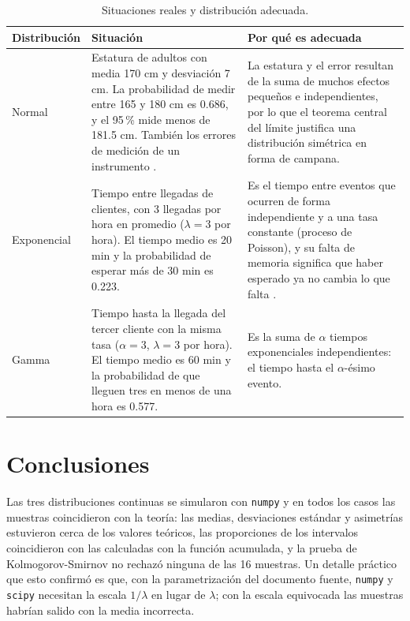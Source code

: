 \documentclass[11pt,letterpaper]{article}
\begin{document}
\begin{table}[htbp]
\centering
\caption{Situaciones reales y distribución adecuada.}
\label{tab:aplicaciones}
\footnotesize
\renewcommand{\arraystretch}{1.3}
\begin{tabular}{p{2.3cm}p{5.2cm}p{5.4cm}}
\hline
\textbf{Distribución} & \textbf{Situación} & \textbf{Por qué es adecuada} \\
\hline
Normal & Estatura de adultos con media 170 cm y desviación 7 cm. La probabilidad de medir entre 165 y 180 cm es 0.686, y el 95\,\% mide menos de 181.5 cm. También los errores de medición de un instrumento \parencite{tecnm2026_documento_fuente}. & La estatura y el error resultan de la suma de muchos efectos pequeños e independientes, por lo que el teorema central del límite justifica una distribución simétrica en forma de campana. \\
Exponencial & Tiempo entre llegadas de clientes, con 3 llegadas por hora en promedio ($\lambda = 3$ por hora). El tiempo medio es 20 min y la probabilidad de esperar más de 30 min es 0.223. & Es el tiempo entre eventos que ocurren de forma independiente y a una tasa constante (proceso de Poisson), y su falta de memoria significa que haber esperado ya no cambia lo que falta \parencite{tecnm2026_documento_fuente}. \\
Gamma & Tiempo hasta la llegada del tercer cliente con la misma tasa ($\alpha = 3$, $\lambda = 3$ por hora). El tiempo medio es 60 min y la probabilidad de que lleguen tres en menos de una hora es 0.577. & Es la suma de $\alpha$ tiempos exponenciales independientes: el tiempo hasta el $\alpha$-ésimo evento. \\
\hline
\end{tabular}
\end{table}

\section{Conclusiones}

Las tres distribuciones continuas se simularon con \texttt{numpy} y en todos los casos las muestras coincidieron con la teoría: las medias, desviaciones estándar y asimetrías estuvieron cerca de los valores teóricos, las proporciones de los intervalos coincidieron con las calculadas con la función acumulada, y la prueba de Kolmogorov-Smirnov no rechazó ninguna de las 16 muestras. Un detalle práctico que esto confirmó es que, con la parametrización del documento fuente, \texttt{numpy} y \texttt{scipy} necesitan la escala $1/\lambda$ en lugar de $\lambda$; con la escala equivocada las muestras habrían salido con la media incorrecta.
\end{document}
